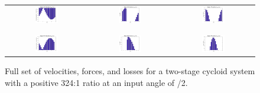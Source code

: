 \begin{figure}[!b]
   \centering
   \begin{tabular}{ccc}
	   \includegraphics[width=0.30\textwidth]{fig/double_1_vel_pi_2} &
	   \includegraphics[width=0.30\textwidth]{fig/double_1_forces_pi_2} &
	   \includegraphics[width=0.30\textwidth]{fig/double_1_losses_pi_2} \\
	   \\
	   \hline
	   \\
	   \includegraphics[width=0.30\textwidth]{fig/double_2_vel_pi_2} &
	   \includegraphics[width=0.30\textwidth]{fig/double_2_forces_pi_2} &
	   \includegraphics[width=0.30\textwidth]{fig/double_2_losses_pi_2} \\
   \end{tabular}
   \caption{Full set of velocities, forces, and losses for a two-stage cycloid system with a positive 324:1 ratio at an input angle of \textpi/2.}
   \label{fig:two_stage_forces_pos}
\end{figure}
